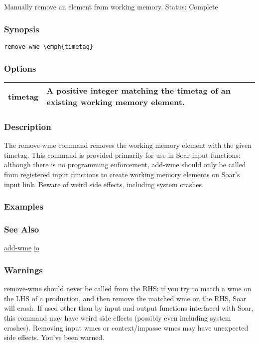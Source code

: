 \subsection{}
\label{remove-wme}
Manually remove an element from working memory. 
 Status: Complete
\subsubsection*{Synopsis}
\begin{verbatim}
remove-wme \emph{timetag}
\end{verbatim}
\subsubsection*{Options}
\begin{tabular}{|l|l|}
\hline 
 timetag  & A positive integer matching the timetag of an existing working memory element.  \\
 \hline 
\end{tabular}
\subsubsection*{Description}
 The remove-wme command removes the working memory element with the given timetag. This command is provided primarily for use in Soar input functions; although there is no programming enforcement, add-wme should only be called from registered input functions to create working memory elements on Soar's input link. 
 Beware of weird side effects, including system crashes. 
\subsubsection*{Examples}
\subsubsection*{See Also}
\hyperref[add-wme]{add-wme} \hyperref[io]{io} \subsubsection*{Warnings}
 remove-wme should never be called from the RHS: if you try to match a wme on the LHS of a production, and then remove the matched wme on the RHS, Soar will crash. 
 If used other than by input and output functions interfaced with Soar, this command may have weird side effects (possibly even including system crashes). Removing input wmes or context/impasse wmes may have unexpected side effects. You've been warned. 
